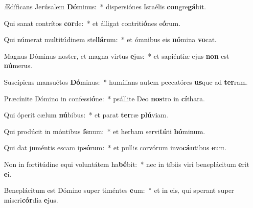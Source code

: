 \item Ædíficans Jerúsalem \textbf{Dó}minus:~* dispersiónes Israélis \textbf{con}gre\textbf{gá}bit.
\item Qui sanat contrítos \textbf{cor}de:~* et álligat contriti\textbf{ó}nes e\textbf{ó}rum.
\item Qui númerat multitúdinem stel\textbf{lá}rum:~* et ómnibus eis \textbf{nó}mina \textbf{vo}cat.
\item Magnus Dóminus noster, et magna virtus \textbf{e}jus:~* et sapiéntiæ ejus \textbf{non} est \textbf{nú}merus.
\item Suscípiens mansuétos \textbf{Dó}minus:~* humílians autem peccatóres \textbf{us}que ad \textbf{ter}ram.
\item Præcínite Dómino in confessi\textbf{ó}ne:~* psállite Deo \textbf{nos}tro in \textbf{cí}thara.
\item Qui óperit cælum \textbf{nú}bibus:~* et parat \textbf{ter}ræ \textbf{plú}viam.
\item Qui prodúcit in móntibus \textbf{fe}num:~* et herbam servi\textbf{tú}ti \textbf{hó}minum.
\item Qui dat juméntis escam ip\textbf{só}rum:~* et pullis corvórum invo\textbf{cán}tibus \textbf{e}um.
\item Non in fortitúdine equi voluntátem ha\textbf{bé}bit:~* nec in tíbiis viri beneplácitum \textbf{e}rit \textbf{e}i.
\item Beneplácitum est Dómino super timéntes \textbf{e}um:~* et in eis, qui sperant super miseri\textbf{cór}dia \textbf{e}jus.
